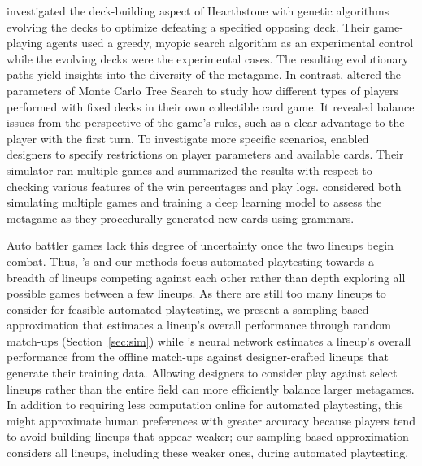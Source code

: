 \documentclass[letterpaper]{article} %
\begin{document}
\citeauthor{bldwth_fdg18}  investigated the deck-building aspect of Hearthstone
with genetic algorithms evolving the decks to optimize defeating a specified
opposing deck.  Their game-playing agents used a greedy, myopic search algorithm
as an experimental control while the evolving decks were the experimental cases.
The resulting evolutionary paths yield insights into the diversity of the metagame.
In contrast, \citeauthor{zhr_arxiv_mcts}  altered the
parameters of Monte Carlo Tree Search to study how different types of players
performed with fixed decks in their own collectible card game.  It revealed balance
issues from the perspective of the game's rules, such as a clear advantage to
the player with the first turn.  To investigate more specific scenarios, \citeauthor{jmalkp_aiide12} 
enabled designers to specify restrictions on player parameters and available cards.
Their simulator ran multiple games and summarized the results with respect to
checking various features of the win percentages and play logs.  \citeauthor{cg_aiide20} 
considered both simulating multiple games and training a deep learning model to
assess the metagame as they procedurally generated new cards using grammars.

Auto battler games lack this degree of uncertainty once the two lineups begin combat.
Thus, \citeauthor{tencent_autobattle_lineup}'s 
and our methods focus automated playtesting towards a breadth of lineups competing
against each other rather than depth exploring all possible games between a few
lineups.
As there are still too many lineups to consider for feasible automated
playtesting, we present a sampling-based approximation that estimates a lineup's overall
performance through random match-ups (Section~\ref{sec:sim}) while
\citeauthor{tencent_autobattle_lineup}'s neural network estimates a lineup's overall
performance from the offline match-ups against designer-crafted lineups that generate
their training data.  Allowing designers to consider play against select lineups
rather than the entire field can more efficiently balance larger metagames.
In addition to requiring less computation online for automated playtesting, this
might approximate human preferences with greater accuracy because players
tend to avoid building lineups that appear weaker; our sampling-based approximation
considers all lineups, including these weaker ones, during automated playtesting.
\fi
\end{document}
